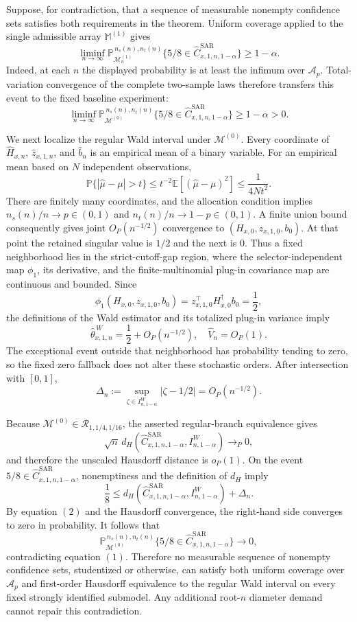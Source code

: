 Suppose, for contradiction, that a sequence of measurable nonempty confidence sets satisfies both requirements in the theorem.  Uniform coverage applied to the single admissible array \(\mathbb M^{(1)}\) gives
\[
\liminf_{n\to\infty}
\mathbb P_{\mathcal M_n^{(1)}}^{\,n_s(n),n_t(n)}
\{5/8\in\widehat C^{\mathrm{SAR}}_{x,1,n,1-\alpha}\}
\ge1-\alpha.
\]
Indeed, at each \(n\) the displayed probability is at least the infimum over \(\mathcal A_p\).  Total-variation convergence of the complete two-sample laws therefore transfers this event to the fixed baseline experiment:
\[
\liminf_{n\to\infty}
\mathbb P_{\mathcal M^{(0)}}^{\,n_s(n),n_t(n)}
\{5/8\in\widehat C^{\mathrm{SAR}}_{x,1,n,1-\alpha}\}
\ge1-\alpha>0. \tag{1}
\]

We next localize the regular Wald interval under \(\mathcal M^{(0)}\).  Every coordinate of \(\widehat H_{x,n}\), \(\widehat z_{x,1,n}\), and \(\widehat b_n\) is an empirical mean of a binary variable.  For an empirical mean based on \(N\) independent observations,
\[
\mathbb P\{|\widehat\mu-\mu|>t\}
\le t^{-2}\mathbb E[(\widehat\mu-\mu)^2]
\le\frac1{4Nt^2}.
\]
There are finitely many coordinates, and the allocation condition implies \(n_s(n)/n\to p\in(0,1)\) and \(n_t(n)/n\to1-p\in(0,1)\).  A finite union bound consequently gives joint \(O_P(n^{-1/2})\) convergence to \((H_{x,0},z_{x,1,0},b_0)\).  At that point the retained singular value is \(1/2\) and the next is \(0\).  Thus a fixed neighborhood lies in the strict-cutoff-gap region, where the selector-independent map \(\phi_1\), its derivative, and the finite-multinomial plug-in covariance map are continuous and bounded.  Since
\[
\phi_1(H_{x,0},z_{x,1,0},b_0)
=z_{x,1,0}^{\top}H_{x,0}^{\dagger}b_0=\frac12,
\]
the definitions of the Wald estimator and its totalized plug-in variance imply
\[
\widehat\theta^{\,W}_{x,1,n}=\frac12+O_P(n^{-1/2}),
\quad
\widehat V_n=O_P(1).
\]
The exceptional event outside that neighborhood has probability tending to zero, so the fixed zero fallback does not alter these stochastic orders.  After intersection with \([0,1]\),
\[
\Delta_n:=\sup_{\zeta\in I^W_{n,1-\alpha}}|\zeta-1/2|
=O_P(n^{-1/2}). \tag{2}
\]

Because \(\mathcal M^{(0)}\in\mathcal R_{1,1/4,1/16}\), the asserted regular-branch equivalence gives
\[
\sqrt n\,d_H\!\left(
\widehat C^{\mathrm{SAR}}_{x,1,n,1-\alpha},I^W_{n,1-\alpha}
\right)\longrightarrow_P0,
\]
and therefore the unscaled Hausdorff distance is \(o_P(1)\).  On the event
\(5/8\in\widehat C^{\mathrm{SAR}}_{x,1,n,1-\alpha}\), nonemptiness and the definition of \(d_H\) imply
\[
\frac18
\le d_H\!\left(
\widehat C^{\mathrm{SAR}}_{x,1,n,1-\alpha},I^W_{n,1-\alpha}
\right)+\Delta_n.
\]
By equation \((2)\) and the Hausdorff convergence, the right-hand side converges to zero in probability.  It follows that
\[
\mathbb P_{\mathcal M^{(0)}}^{\,n_s(n),n_t(n)}
\{5/8\in\widehat C^{\mathrm{SAR}}_{x,1,n,1-\alpha}\}
\longrightarrow0,
\]
contradicting equation \((1)\).  Therefore no measurable sequence of nonempty confidence sets, studentized or otherwise, can satisfy both uniform coverage over \(\mathcal A_p\) and first-order Hausdorff equivalence to the regular Wald interval on every fixed strongly identified submodel.  Any additional root-\(n\) diameter demand cannot repair this contradiction.


